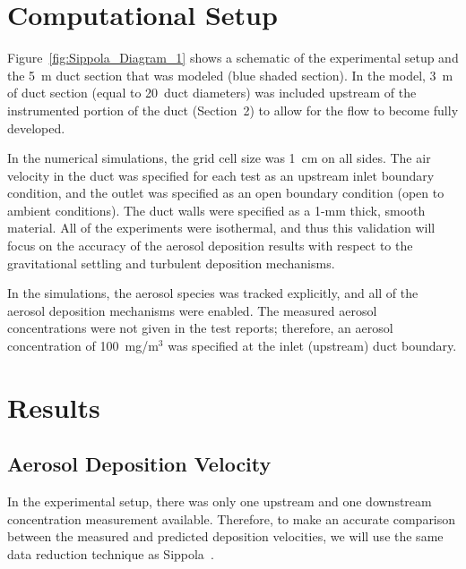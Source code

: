 \clearpage


\section{Computational Setup}
\label{sec:Computational Setup}

Figure~\ref{fig:Sippola_Diagram_1} shows a schematic of the experimental setup and the 5~m duct section that was modeled (blue shaded section). In the model, 3~m of duct section (equal to 20~duct diameters) was included upstream of the instrumented portion of the duct (Section~2) to allow for the flow to become fully developed.

In the numerical simulations, the grid cell size was 1~cm on all sides. The air velocity in the duct was specified for each test as an upstream inlet boundary condition, and the outlet was specified as an open boundary condition (open to ambient conditions). The duct walls were specified as a 1-mm thick, smooth material. All of the experiments were isothermal, and thus this validation will focus on the accuracy of the aerosol deposition results with respect to the gravitational settling and turbulent deposition mechanisms.

In the simulations, the aerosol species was tracked explicitly, and all of the aerosol deposition mechanisms were enabled. The measured aerosol concentrations were not given in the test reports; therefore, an aerosol concentration of 100~mg/m$^3$ was specified at the inlet (upstream) duct boundary.

\section{Results}
\label{sec:Results}

\subsection{Aerosol Deposition Velocity}

In the experimental setup, there was only one upstream and one downstream concentration measurement available. Therefore, to make an accurate comparison between the measured and predicted deposition velocities, we will use the same data reduction technique as Sippola~\cite{Sippola:2002,Sippola:2010}.

